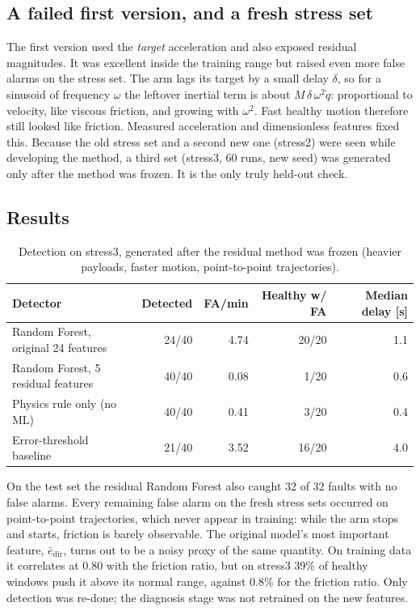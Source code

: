 \documentclass[11pt,a4paper]{article}
\begin{document}
\subsection{A failed first version, and a fresh stress set}
The first version used the \emph{target} acceleration and also exposed residual magnitudes. It was excellent inside
the training range but raised even more false alarms on the stress set. The arm lags its target by a small delay
$\delta$, so for a sinusoid of frequency $\omega$ the leftover inertial term is about $M\,\delta\,\omega^2\dot q$:
proportional to velocity, like viscous friction, and growing with $\omega^2$. Fast healthy motion therefore still
looked like friction. Measured acceleration and dimensionless features fixed this. Because the old stress set and a
second new one (stress2) were seen while developing the method, a third set (stress3, 60 runs, new seed) was generated
only after the method was frozen. It is the only truly held-out check.

\subsection{Results}
\begin{table}[h]
\centering
\caption{Detection on stress3, generated after the residual method was frozen (heavier payloads, faster motion,
point-to-point trajectories).}
\small
\begin{tabular}{lrrrr}
\toprule
Detector & Detected & FA/min & Healthy w/ FA & Median delay [s] \\
\midrule
Random Forest, original 24 features & 24/40 & 4.74 & 20/20 & 1.1 \\
Random Forest, 5 residual features  & 40/40 & 0.08 & 1/20  & 0.6 \\
Physics rule only (no ML)           & 40/40 & 0.41 & 3/20  & 0.4 \\
Error-threshold baseline            & 21/40 & 3.52 & 16/20 & 4.0 \\
\bottomrule
\end{tabular}
\end{table}

On the test set the residual Random Forest also caught 32 of 32 faults with no false alarms. Every remaining false
alarm on the fresh stress sets occurred on point-to-point trajectories, which never appear in training: while the arm
stops and starts, friction is barely observable. The original model's most important feature,
$\bar e_{\text{dir}}$, turns out to be a noisy proxy of the same quantity. On training data it correlates at 0.80
with the friction ratio, but on stress3 39\% of healthy windows push it above its normal range, against 0.8\% for the
friction ratio. Only detection was re-done; the diagnosis stage was not retrained on the new features.
\end{document}
